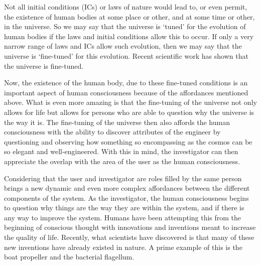 \begin{quoting}
Not all initial conditions (ICs) or laws of nature
would lead to, or even permit, the existence of human bodies at some
place or other, and at some time or other, in the universe. So we may
say that the universe is `tuned' for the evolution of human bodies if
the laws and initial conditions allow this to occur. If only a very
narrow range of laws and ICs allow such evolution, then we may say that
the universe is `fine-tuned' for this evolution. Recent scientific work
has shown that the universe is fine-tuned. \citep{swinburne2004}
\end{quoting}

Now, the existence of the human body, due to these fine-tuned conditions
is an important aspect of human consciousness because of the
affordances mentioned above. What is even more amazing is that the fine-tuning 
of the universe not only allows for life but allows for persons
who are able to question why the universe is the way it is. The
fine-tuning of the universe then also affords the human consciousness
with the ability to discover attributes of the engineer by questioning
and observing how something so encompassing as the cosmos can be so
elegant and well-engineered. With this in mind, the investigator can
then appreciate the overlap with the area of the user as the human
consciousness.

Considering that the user and investigator are roles filled by the same
person brings a new dynamic and even more complex affordances between
the different components of the system. As the investigator, the human
consciousness begins to question why things are the way they are within
the system, and if there is any way to improve the system. Humans have
been attempting this from the beginning of conscious thought with
innovations and inventions meant to increase the quality of life.
Recently, what scientists have discovered is that many of these new
inventions have already existed in nature. A prime example of this is
the boat propeller and the bacterial flagellum. 

